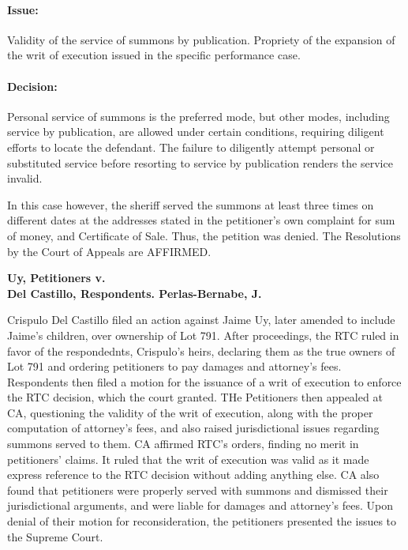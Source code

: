 \documentclass[
12pt,
oneside,
onehalfspacing,
headsepline
]{DigestCollection}
\begin{document}
\paragraph{Issue:}
\label{94f0a730-09fd-11ef-932c-63c852f65e48}


Validity of the service of summons by publication. Propriety of the expansion of the writ of execution issued in the specific performance case.

\paragraph{Decision:}
\label{96a1d9a0-09fd-11ef-932c-63c852f65e48}


Personal service of summons is the preferred mode, but other modes, including service by publication, are allowed under certain conditions, requiring diligent efforts to locate the defendant. The failure to diligently attempt personal or substituted service before resorting to service by publication renders the service invalid.

In this case however, the sheriff served the summons at least three times on different dates at the addresses stated in the petitioner's own complaint for sum of money, and Certificate of Sale. Thus, the petition was denied. The Resolutions by the Court of Appeals are AFFIRMED.

\label{d1d74cf0-0a0f-11ef-932c-63c852f65e48}


\noindent\textbf{Uy, Petitioners v. \\Del Castillo, Respondents. Perlas-Bernabe, J.}\vspace{0.4cm}

Crispulo Del Castillo filed an action against Jaime Uy, later amended to include Jaime's children, over ownership of Lot 791. After proceedings, the RTC ruled in favor of the respondednts, Crispulo's heirs, declaring them as the true owners of Lot 791 and ordering petitioners to pay damages and attorney's fees. Respondents then filed a motion for the issuance of a writ of execution to enforce the RTC decision, which the court granted. THe Petitioners then appealed at CA, questioning the validity of the writ of execution, along with the proper computation of attorney's fees, and also raised jurisdictional issues regarding summons served to them. CA affirmed RTC's orders, finding no merit in petitioners' claims. It ruled that the writ of execution was valid as it made express reference to the RTC decision without adding anything else. CA also found that petitioners were properly served with summons and dismissed their jurisdictional arguments, and were liable for damages and attorney's fees. Upon denial of their motion for reconsideration, the petitioners presented the issues to the Supreme Court.
\end{document}
